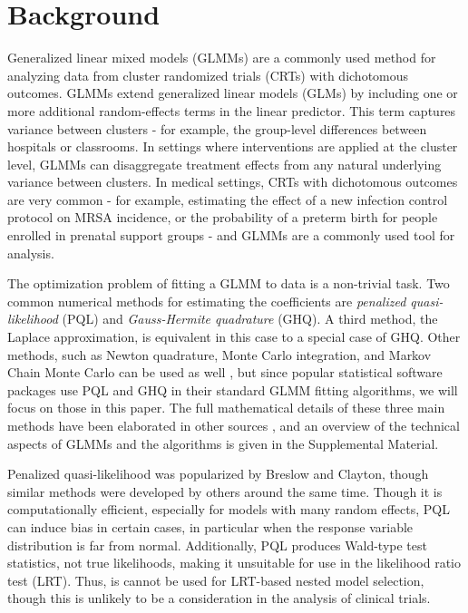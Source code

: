 \documentclass[Afour,times,sagev,doublespace]{sagej}
\begin{document}
\section{Background}
Generalized linear mixed models (GLMMs) are a commonly used method for analyzing data from cluster randomized trials (CRTs) with dichotomous outcomes. GLMMs extend generalized linear models (GLMs) by including one or more additional random-effects terms in the linear predictor. This term captures variance between clusters - for example, the group-level differences between hospitals or classrooms. In settings where interventions are applied at the cluster level, GLMMs can disaggregate treatment effects from any natural underlying variance between clusters. In medical settings, CRTs with dichotomous outcomes are very common - for example, estimating the effect of a new infection control protocol on MRSA incidence, or the probability of a preterm birth for people enrolled in prenatal support groups - and GLMMs are a commonly used tool for analysis. 

The optimization problem of fitting a GLMM to data is a non-trivial task. Two common numerical methods for estimating the coefficients are \textit{penalized quasi-likelihood} (PQL) \cite{wolfinger_generalized_1993} and \textit{Gauss-Hermite quadrature} (GHQ). A third method, the Laplace approximation, is equivalent in this case to a special case of GHQ\cite{liu_note_1994}. Other methods, such as Newton quadrature, Monte Carlo integration, and Markov Chain Monte Carlo can be used as well \cite{zhang_fitting_2011}, but since popular statistical software packages use PQL and GHQ in their standard GLMM fitting algorithms, we will focus on those in this paper. The full mathematical details of these three main methods have been elaborated in other sources \cite{wolfinger_generalized_1993}\cite{pinheiro_efficient_2006}, and an overview of the technical aspects of GLMMs and the algorithms is given in the Supplemental Material.

Penalized quasi-likelihood was popularized by Breslow and Clayton\cite{breslow_approximate_1993}, though similar methods were developed by others\cite{zeger_models_1988}\cite{engel_simple_1994} around the same time. Though it is computationally efficient, especially for models with many random effects, PQL can induce bias in certain cases, in particular when the response variable distribution is far from normal\cite{agresti_categorical_2013}\cite{rodriguez_assessment_1995}\cite{breslow_bias_1995}\cite{lin_bias_1996}. Additionally, PQL produces Wald-type test statistics, not true likelihoods, making it unsuitable for use in the likelihood ratio test (LRT). Thus, is cannot be used for LRT-based nested model selection\cite{zhang_fitting_2011}\cite{pinheiro_efficient_2006}\cite{ng_estimation_2006}, though this is unlikely to be a consideration in the analysis of clinical trials.
\end{document}
